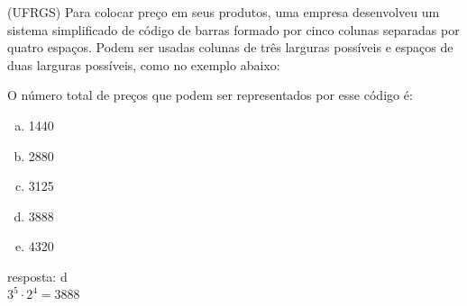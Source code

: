 \begin{ex}
(UFRGS) Para colocar preço em seus produtos, uma empresa desenvolveu um sistema simplificado de código de barras formado por cinco colunas separadas por quatro espaços. Podem ser usadas colunas de três larguras possíveis e espaços de duas larguras possíveis, como no exemplo abaixo:
\begin{center}
\end{center}
O número total de preços que podem ser representados por esse código é:
   \begin{enumerate}[(a)]
   \item 1440
   \item 2880
   \item 3125
   \item 3888
   \item 4320
   \end{enumerate}
     \begin{sol}
        resposta: d \\
        $3^5\cdot2^4=3888$
     \end{sol}
\end{ex}